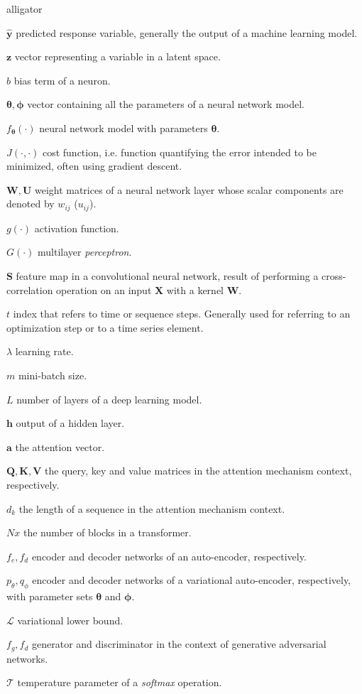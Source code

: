 \begin{labeling}{alligator}
	\item [$\mathbf{\hat{y}}$] predicted response variable, generally the output of a machine learning model.
	\item [$\mathbf{z}$] vector representing a variable in a latent space.
	\item [$b$] bias term of a neuron.
	\item [$\mathbf{\theta}, \mathbf{\phi}$] vector containing all the parameters of a neural network model.
	\item [$f_\mathbf{\theta}(\cdot)$] neural network model with parameters $\mathbf{\theta}$.
	\item [$J(\cdot, \cdot)$] cost function, i.e. function quantifying the error intended to be minimized, often using gradient descent.
	\item [$\mathbf{W}, \mathbf{U}$] weight matrices of a neural network layer whose scalar components are denoted by $w_{ij}$ ($u_{ij}$).
	\item[$g(\cdot)$] activation function.
	\item[$G(\cdot)$] multilayer \textit{perceptron}.
	\item[$\mathbf{S}$] feature map in a convolutional neural network, result of performing a cross-correlation operation on an input $\mathbf{X}$ with a kernel $\mathbf{W}$.
	\item[$t$] index that refers to time or sequence steps. Generally used for referring to  an optimization step or to a time series element.
	\item[$\lambda$] learning rate.
	\item[$m$] mini-batch size.
	\item[$L$] number of layers of a deep learning model.
	\item[$\mathbf{h}$] output of a hidden layer.
	\item[$\mathbf{a}$] the attention vector.
	\item[$\mathbf{Q}, \mathbf{K}, \mathbf{V}$] the query, key and value matrices in the attention mechanism context, respectively.
	\item[$d_k$]{the length of a sequence in the attention mechanism context.}
	\item[$Nx$]{the number of blocks in a transformer.}
	\item[$f_e, f_d$]{encoder and decoder networks of an auto-encoder, respectively.}
	\item[$p_\theta, q_\phi$]{encoder and decoder networks of a variational auto-encoder, respectively, with parameter sets $\mathbf{\theta}$ and $\mathbf{\phi}$.}
	\item[$\mathcal{L}$]{variational lower bound.}
	\item[$f_g, f_d$]{generator and discriminator in the context of generative adversarial networks.}
	\item[$\mathcal{T}$] temperature parameter of a \textit{softmax} operation.
\end{labeling}

